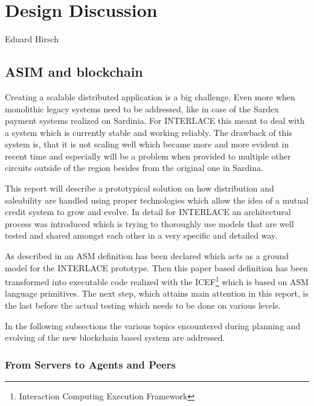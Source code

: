 \chapter{Design Discussion}
\label{ch:design}

\vspace{-1cm}
\begin{center}
Eduard Hirsch
\end{center}

\section{ASIM and blockchain}
\label{sec:asim}

Creating a scalable distributed application is a big challenge. Even more when monolithic legacy systems need to be addressed, like in case of the Sardex payment systems realized on Sardinia. For INTERLACE this meant to deal with a system which is currently stable and working reliably. The drawback of this system is, that it is not scaling well which became more and more evident in recent time and especially will be a problem when provided to multiple other circuits outside of the region besides from the original one in Sardina.

This report will describe a prototypical solution on how distribution and saleability are handled using proper technologies which allow the idea of a mutual credit system to grow and evolve. In detail for INTERLACE an architectural process was introduced which is trying to thoroughly use models that are well tested and shared amongst each other in a very specific and detailed way.

As described in \cite{INTERLACE_D21} an ASM definition has been declared which acts as a ground model for the INTERLACE prototype. Then this paper based definition has been transformed into executable code realized with the ICEF\footnote{Interaction Computing Execution Framework} which is based on ASM language primitives. The next step, which attains main attention in this report, is the last before the actual testing which needs to be done on various levels.

In the following subsections the various topics encountered during planning and evolving of the new blockchain based system are addressed.

\subsection{From Servers to Agents and Peers}

